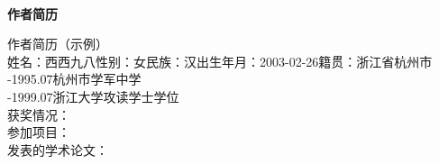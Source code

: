 \clearpage
{}

\begin{center}
    ~\\[-1.5em]
    \textbf{作者简历}
\end{center}


\noindent 作者简历（示例）\\
\noindent 姓名：西西九八\quad 性别：女\quad 民族：汉\quad 出生年月：2003-02-26\quad 籍贯：浙江省杭州市 \\
-1995.07\qquad 杭州市学军中学 \\
-1999.07\qquad 浙江大学攻读学士学位 \\
\noindent 获奖情况：\\
\noindent 参加项目：\\
\noindent 发表的学术论文：\\
